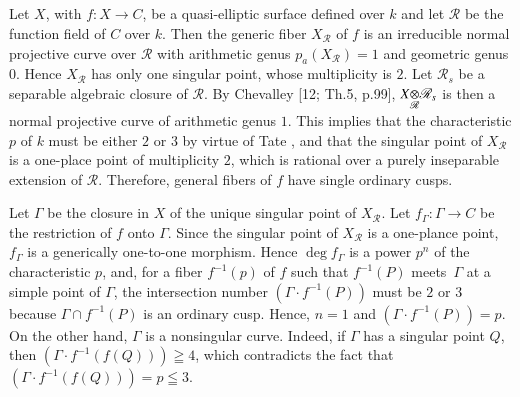 \subsection{}\label{chap3:2.2}
Let $X$, with $f:X\to C$, be a quasi-elliptic surface defined over $k$
and let $\mathscr{R}$ be the function field of $C$ over $k$. Then the
generic fiber $X_{\mathscr{R}}$ of $f$ is an irreducible normal
projective curve over $\mathscr{R}$ with arithmetic genus
$p_{a}(X_{\mathscr{R}})=1$ and geometric genus $0$. Hence
$X_{\mathscr{R}}$ has only one singular point, whose multiplicity is
$2$. Let $\mathscr{R}_{s}$ be a separable algebraic closure of
$\mathscr{R}$. By Chevalley [12; Th.\@ 5, p.99],
$\foprod{X}{\mathscr{R}_{s}}{\mathscr{R}}$ is then a normal projective
curve of arithmetic genus $1$. This implies that the characteristic
$p$ of $k$ must be either $2$ or $3$ by virtue of Tate \cite{55}, and
that the singular point of $X_{\mathscr{R}}$ is a one-place point of
multiplicity $2$, which is rational over a purely inseparable
extension of $\mathscr{R}$. Therefore, general fibers of $f$ have
single ordinary cusps.

Let $\Gamma$ be the closure in $X$ of the unique singular point of
$X_{\mathscr{R}}$. Let $f_{\Gamma}:\Gamma\to C$ be the restriction of
$f$ onto $\Gamma$. Since the singular point of $X_{\mathscr{R}}$ is a
one-plance point, $f_{\Gamma}$ is a generically one-to-one
morphism. Hence $\deg f_{\Gamma}$ is a power $p^{n}$ of the
characteristic $p$, and, for a fiber $f^{-1}(p)$ of $f$ such that
$f^{-1}(P)$ meets\pageoriginale\ $\Gamma$ at a simple point of
$\Gamma$, the intersection number $(\Gamma\cdot f^{-1}(P))$ must be
$2$ or $3$ because $\Gamma\cap f^{-1}(P)$ is an ordinary cusp. Hence,
$n=1$ and $(\Gamma\cdot f^{-1}(P))=p$. On the other hand, $\Gamma$ is
a nonsingular curve. Indeed, if $\Gamma$ has a singular point $Q$,
then $(\Gamma\cdot f^{-1}(f(Q)))\geqq 4$, which contradicts the fact
that $(\Gamma\cdot f^{-1}(f(Q)))=p\leqq 3$.

